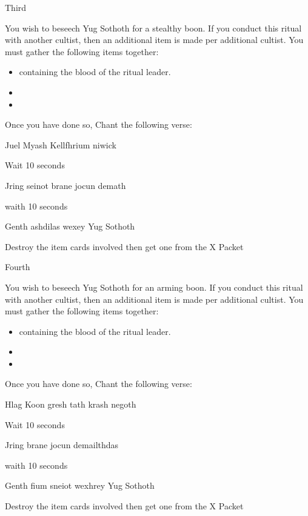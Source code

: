 \documentclass[greennotebook]{guildcamp4} %
\begin{document}
\begin{page}{Third}
	
		You wish to beseech Yug Sothoth for a stealthy boon. If you conduct this ritual with another cultist, then an additional item is made per additional cultist. You must gather the following items together: 
		
		\begin{itemize}
			\item \iTestTube{} containing the blood of the ritual leader.
			\item \iGlassLens{}
			\item \iCauldron{}
		\end{itemize}		
		
		Once you have done so, Chant the following verse:
		
		Juel Myash Kellfhrium niwick
		
		Wait 10 seconds
		
		Jring seinot brane jocun demath
		
		waith 10 seconds
		
		Genth ashdilas wexey Yug Sothoth
		
		Destroy the item cards involved then get one \iInvisibilityCloak{} from the X Packet
	
\end{page}

\begin{page}{Fourth}
	
		You wish to beseech Yug Sothoth for an arming boon. If you conduct this ritual with another cultist, then an additional item is made per additional cultist. You must gather the following items together: 
		
		\begin{itemize}
			\item \iTestTube{} containing the blood of the ritual leader.
			\item \iMultitool{}
			\item \iScrapMetal{}
		\end{itemize}		
		
		Once you have done so, Chant the following verse:
		
		Hlag Koon gresh tath krash negoth
		
		Wait 10 seconds
		
		Jring  brane jocun demailthdas
		
		waith 10 seconds
		
		Genth fium sneiot wexhrey Yug Sothoth
		
		Destroy the item cards involved then get one \iCRUpPotion{} from the X Packet

	
\end{page}
\end{document}
